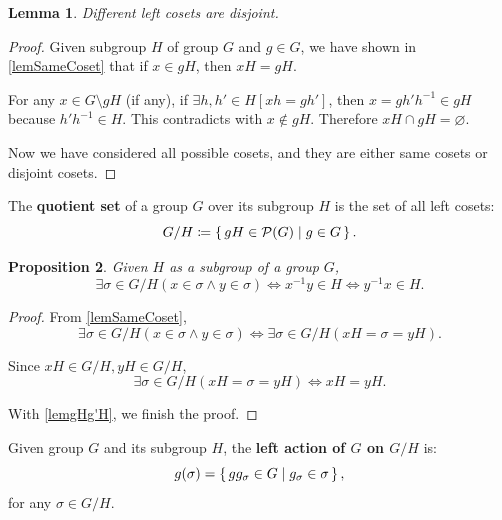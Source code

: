 \documentclass[12pt, letterpaper]{article}
\newcommand{\power}{\mathcal{P}}
\newcommand{\define}{\coloneqq}
\renewcommand{\emptyset}{\varnothing}
\newtheorem{prop}{Proposition}[section]
\newtheorem{lem}[prop]{Lemma}
\theoremstyle{definition}
\theoremstyle{remark}
\theoremstyle{definition}
\theoremstyle{plain}
\numberwithin{equation}{section}
\begin{document}
	\begin{lem}\label{lemDisjointLeftCoset}
		Different left cosets are disjoint.
	\end{lem}
	\begin{proof}
		Given subgroup $H$ of group $G$ and $g\in G$,
		we have shown in \ref{lemSameCoset} that if $x\in gH$, then $xH=gH$.
		
		For any $x\in G\setminus gH$ (if any),
		if $\exists h,h'\in H[xh=gh']$, then $x=gh'h^{-1}\in gH$ because $h'h^{-1}\in H$.
		This contradicts with $x\notin gH$. Therefore $xH\cap gH=\emptyset$.
		
		Now we have considered all possible cosets, and they are either same cosets or disjoint cosets.
	\end{proof}

	\begin{def*}
		The \textbf{quotient set} of a group $G$ over its subgroup $H$ is the set of all left cosets:
		\[G/H\define\set{gH\in\power(G)|g\in G}. \]
	\end{def*}

	\begin{prop}\label{lemXsigmaYsigma}
		Given $H$ as a subgroup of a group $G$,
		\[\exists \sigma\in G/H(x\in\sigma \land y\in \sigma)\iff x^{-1}y\in H\iff y^{-1}x\in H.\]
	\end{prop}
	\begin{proof}
		From \ref{lemSameCoset},
		\[\exists \sigma\in G/H(x\in\sigma \land y\in \sigma)\iff \exists \sigma \in G/H(xH=\sigma=yH).\]
		
		Since $xH\in G/H,yH\in G/H$,
		\[\exists \sigma \in G/H(xH=\sigma=yH)\iff xH=yH.\]
		
		With \ref{lemgHg'H}, we finish the proof.
	\end{proof}

	\begin{def*}
		Given group $G$ and its subgroup $H$,
		the \textbf{left action of $G$ on $G/H$} is:
		\[g(\sigma) =\set{gg_{\sigma}\in G|g_\sigma\in \sigma}, \]
		for any $\sigma\in G/H$.
	\end{def*}
\end{document}

